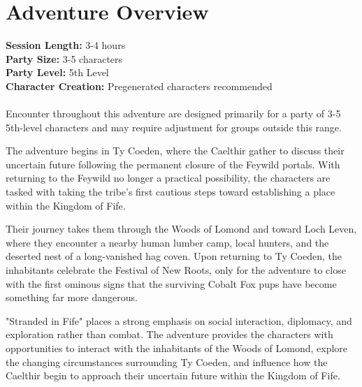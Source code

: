 \section*{\LARGE Adventure Overview}
{\entryfont\textbf{Session Length:} 3-4 hours\\
\textbf{Party Size:} 3-5 characters\\
\textbf{Party Level:} 5th Level\\
\textbf{Character Creation:} Pregenerated characters recommended\\\\
Encounter throughout this adventure are designed primarily for a party of 3-5 5th-level characters and may require adjustment for groups outside this range.

\noindent The adventure begins in Ty Coeden, where the Caelthir gather to discuss their uncertain future following the permanent closure of the Feywild portals. With returning to the Feywild no longer a practical possibility, the characters are tasked with taking the tribe's first cautious steps toward establishing a place within the Kingdom of Fife.

Their journey takes them through the Woods of Lomond and toward Loch Leven, where they encounter a nearby human lumber camp, local hunters, and the deserted nest of a long-vanished hag coven. Upon returning to Ty Coeden, the inhabitants celebrate the Festival of New Roots, only for the adventure to close with the first ominous signs that the surviving Cobalt Fox pups have become something far more dangerous.

"Stranded in Fife" places a strong emphasis on social interaction, diplomacy, and exploration rather than combat. The adventure provides the characters with opportunities to interact with the inhabitants of the Woods of Lomond, explore the changing circumstances surrounding Ty Coeden, and influence how the Caelthir begin to approach their uncertain future within the Kingdom of Fife.}